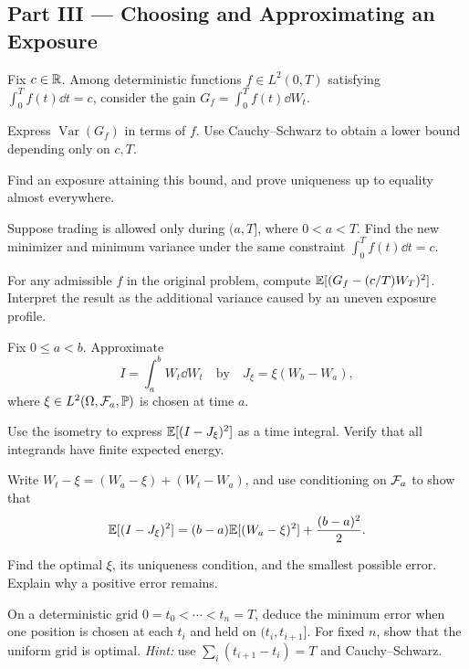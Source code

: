 \clearpage
\subsection*{Part III --- Choosing and Approximating an Exposure}

\begin{exercise}
Fix \(c\in\mathbb{R}\). Among deterministic functions \(f\in L^2(0,T)\)
satisfying \(\int_0^T f(t)\dd t=c\), consider the gain
\(G_f=\int_0^T f(t)\dd W_t\).
\begin{exparts}
  \item Express \(\operatorname{Var}(G_f)\) in terms of \(f\).
  Use Cauchy--Schwarz to obtain a lower bound depending only on \(c,T\).
  \item Find an exposure attaining this bound, and prove uniqueness up to
  equality almost everywhere.
  \item Suppose trading is allowed only during \((a,T]\), where
  \(0<a<T\). Find the new minimizer and minimum variance under the same
  constraint \(\int_0^T f(t)\dd t=c\).
  \item For any admissible \(f\) in the original problem, compute
  \(\mathbb{E}[(G_f-(c/T)W_T)^2]\). Interpret the result as the additional
  variance caused by an uneven exposure profile.
\end{exparts}
\end{exercise}

\begin{exercise}
Fix \(0\leq a<b\). Approximate
\[
I=\int_a^b W_t\dd W_t
\quad\text{by}\quad
J_\xi=\xi(W_b-W_a),
\]
where \(\xi\in L^2(\Omega,\mathcal{F}_a,\mathbb{P})\) is chosen at time \(a\).
\begin{exparts}
  \item Use the isometry to express \(\mathbb{E}[(I-J_\xi)^2]\) as a time
  integral. Verify that all integrands have finite expected energy.
  \item Write \(W_t-\xi=(W_a-\xi)+(W_t-W_a)\), and use conditioning
  on \(\mathcal{F}_a\) to show that
  \[
  \mathbb{E}[(I-J_\xi)^2]
  =(b-a)\mathbb{E}[(W_a-\xi)^2]+\frac{(b-a)^2}{2}.
  \]
  \item Find the optimal \(\xi\), its uniqueness condition, and the
  smallest possible error. Explain why a positive error remains.
  \item On a deterministic grid \(0=t_0<\cdots<t_n=T\), deduce the
  minimum error when one position is chosen at each \(t_i\) and held on
  \((t_i,t_{i+1}]\). For fixed \(n\), show that the uniform grid is optimal.
  \emph{Hint:} use \(\sum_i(t_{i+1}-t_i)=T\) and Cauchy--Schwarz.
\end{exparts}
\end{exercise}

